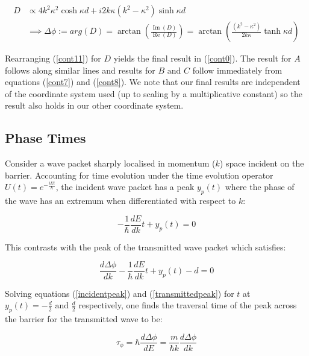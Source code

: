\documentclass{article}
\begin{document}
\begin{align}
	D &\propto 4k^2\kappa^2 \cosh{\kappa d}+i2k\kappa(k^2-\kappa^2)\sinh{\kappa d} \\
	  &\implies \Delta \phi := arg(D) = \arctan\left(\frac{\operatorname{Im}(D)}{\operatorname{Re}(D)}\right) = \arctan\left(\frac{(k^2-\kappa^2)}{2k\kappa}\tanh{\kappa d}\right) \label{phasechange}
\end{align}

\noindent Rearranging (\ref{cont11}) for $D$ yields the final result in (\ref{cont0}). The result for $A$ follows along similar lines and results for $B \text{ and } C$ follow immediately from equations (\ref{cont7}) and (\ref{cont8}). We note that our final results are independent of the coordinate system used (up to scaling by a multiplicative constant) so the result also holds in our other coordinate system.

\subsection{Phase Times}

\noindent Consider a wave packet sharply localised in momentum ($k$) space incident on the barrier. Accounting for time evolution under the time evolution operator $U(t)=e^{-\frac{iEt}{\hbar}}$, the incident wave packet has a peak $y_p(t)$ where the phase of the wave has an extremum when differentiated with respect to $k$:

\begin{equation}
	-\frac{1}{\hbar}\frac{dE}{dk}t+y_p(t)=0
	\label{incidentpeak}
\end{equation}

\noindent This contrasts with the peak of the transmitted wave packet which satisfies:

\begin{equation}
	\frac{d\Delta\phi}{dk}-\frac{1}{\hbar}\frac{dE}{dk}t+y_p(t)-d=0
	\label{transmittedpeak}
\end{equation}

\noindent Solving equations (\ref{incidentpeak}) and (\ref{transmittedpeak}) for $t$ at $y_p(t) = -\frac{d}{2} \text{ and } \frac{d}{2}$ respectively, one finds the traversal time of the peak across the barrier for the transmitted wave to be:

\begin{equation}
	\tau_\phi = \hbar \frac{d\Delta\phi}{dE} = \frac{m}{\hbar k}\frac{d\Delta\phi}{dk}
	\label{buttikerphasetime}
\end{equation}
\end{document}
